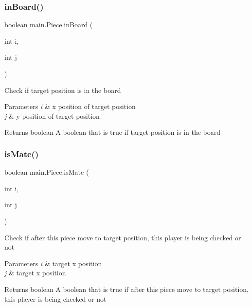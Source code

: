 \subsubsection{\texorpdfstring{inBoard()}{inBoard()}}
{\footnotesize\ttfamily boolean main.\+Piece.\+in\+Board (\begin{DoxyParamCaption}\item[{int}]{i,  }\item[{int}]{j }\end{DoxyParamCaption})\hspace{0.3cm}{\ttfamily [inline]}}

Check if target position is in the board


\begin{DoxyParams}{Parameters}
{\em i} & x position of target position \\
\hline
{\em j} & y position of target position \\
\hline
\end{DoxyParams}
\begin{DoxyReturn}{Returns}
boolean A boolean that is true if target position is in the board 
\end{DoxyReturn}
\mbox{\label{classmain_1_1_piece_a6fd7622cdb9f1e91c00b416af8cfd043}} 
\subsubsection{\texorpdfstring{isMate()}{isMate()}}
{\footnotesize\ttfamily boolean main.\+Piece.\+is\+Mate (\begin{DoxyParamCaption}\item[{int}]{i,  }\item[{int}]{j }\end{DoxyParamCaption})\hspace{0.3cm}{\ttfamily [inline]}}

Check if after this piece move to target position, this player is being checked or not


\begin{DoxyParams}{Parameters}
{\em i} & target x position \\
\hline
{\em j} & target x position \\
\hline
\end{DoxyParams}
\begin{DoxyReturn}{Returns}
boolean A boolean that is true if after this piece move to target position, this player is being checked or not 
\end{DoxyReturn}
\mbox{\label{classmain_1_1_piece_ae0c25ed29cd5eb75822bbba3068a283c}} 
